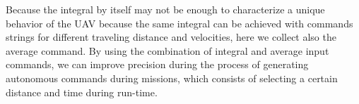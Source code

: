 \documentclass[letterpaper, 10 pt, conference]{ieeeconf}  %
\newcommand\NB[1]{$\spadesuit$\footnote{NB: #1}}
\begin{document}

Because the integral by itself may not be enough to characterize a unique behavior of the UAV because the same integral can be achieved with commands strings for different traveling distance and velocities, here we collect also the average command. By using the combination of integral and average input commands, we can improve precision during the process of generating autonomous commands during missions, which consists of selecting a certain distance and time during run-time.

%
\end{document}
